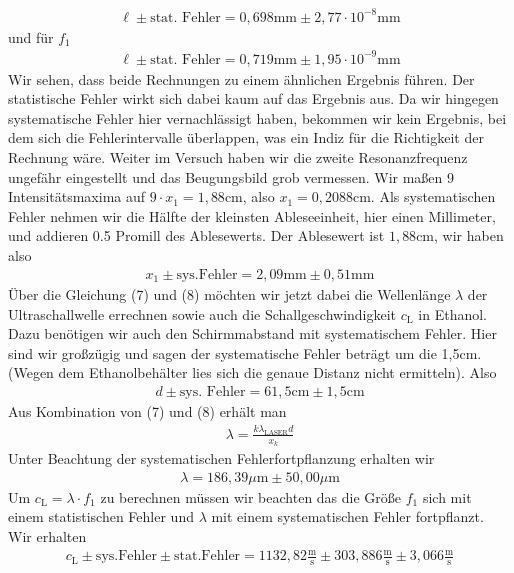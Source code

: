 \documentclass[a4paper, 12pt]{scrartcl}
\begin{document}
\begin{align*}
\ell \pm \textrm{stat. Fehler}  = 0,698  \textrm{mm} \pm 2,77\cdot 10^{-8}\textrm{mm}  
\end{align*}
und für $f_1$
\begin{align*}
\ell \pm \textrm{stat. Fehler}  = 0,719 \textrm{mm} \pm 1,95 \cdot 10^{-9}\textrm{mm}
\end{align*}
Wir sehen, dass beide Rechnungen zu einem ähnlichen Ergebnis führen. Der statistische Fehler wirkt sich dabei kaum auf das Ergebnis aus. Da wir hingegen systematische Fehler hier vernachlässigt haben, bekommen wir kein Ergebnis, bei dem sich die Fehlerintervalle überlappen, was ein Indiz für die Richtigkeit der Rechnung wäre. Weiter im Versuch haben wir die zweite Resonanzfrequenz ungefähr eingestellt und das Beugungsbild grob vermessen. Wir maßen 9 Intensitätsmaxima auf $9\cdot x_1 = 1,88$cm, also $x_1 = 0,2088$cm. Als systematischen Fehler nehmen wir die Hälfte der kleinsten Ableseeinheit, hier einen Millimeter, und addieren 0.5 Promill des Ablesewerts. Der Ablesewert ist $1,88$cm, wir haben also 
\begin{align*}
x_1 \pm \textrm{sys.Fehler} = 2,09\textrm{mm} \pm 0,51\textrm{mm} 
\end{align*}
Über die Gleichung (7) und (8) möchten wir jetzt dabei die Wellenlänge $\lambda$ der Ultraschallwelle errechnen sowie auch die Schallgeschwindigkeit $c_\textrm{L}$ in Ethanol. Dazu benötigen wir auch den Schirmmabstand mit systematischem Fehler. Hier sind wir großzügig und sagen der systematische Fehler beträgt um die 1,5cm. (Wegen dem Ethanolbehälter lies sich die genaue Distanz nicht ermitteln). Also 
\begin{align*}
d \pm \textrm{sys. Fehler} = 61,5\textrm{cm} \pm 1,5 \textrm{cm}
\end{align*}
Aus Kombination von (7) und (8) erhält man 
\begin{align*}
\lambda = \frac{k \lambda_{\textrm{LASER}} d}{x_k}
\end{align*}
Unter Beachtung der systematischen Fehlerfortpflanzung erhalten wir 
\begin{align*}
\lambda = 186,39\mu \textrm{m} \pm 50,00 \mu \textrm{m}
\end{align*}
Um $c_\textrm{L} = \lambda \cdot f_1$ zu berechnen müssen wir beachten das die Größe $f_1$ sich mit einem statistischen Fehler und $\lambda$ mit einem systematischen Fehler fortpflanzt. Wir erhalten 
\begin{align*}
c_\textrm{L} \pm \textrm{sys.Fehler} \pm \textrm{stat.Fehler} = 1132,82 \frac{\textrm{m}}{\textrm{s}} \pm 303,886\frac{\textrm{m}}{\textrm{s}} \pm 3,066 \frac{\textrm{m}}{\textrm{s}}
\end{align*} 
\end{document}
